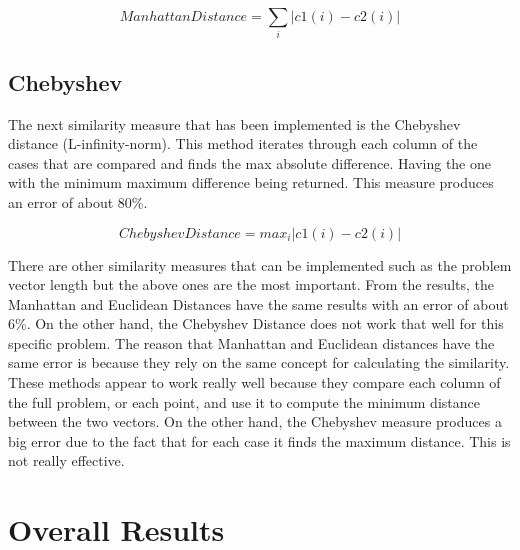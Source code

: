 \documentclass[a4paper,11pt]{article}
\begin{document}
\begin{equation}
Manhattan Distance = \sum_i |c1(i) - c2(i)|
\end{equation}

\subsection{Chebyshev}
The next similarity measure that has been implemented is the Chebyshev distance
(L-infinity-norm). This method iterates through each column of the cases that
are compared and finds the max absolute difference. Having the one with the
minimum maximum difference being returned. This measure produces an error of
about 80\%.

\begin{equation}
Chebyshev Distance = max_i |c1(i) - c2(i)|
\end{equation}

There are other similarity measures that can be implemented such as the problem
vector length but the above ones are the most important. From the results, the
Manhattan and Euclidean Distances have the same results with an error of about
6\%. On the other hand, the Chebyshev Distance does not work that well for this
specific problem. The reason that Manhattan and Euclidean distances have the
same error is because they rely on the same concept for calculating the
similarity. These methods appear to work really well because they compare each
column of the full problem, or each point, and use it to compute the minimum
distance between the two vectors. On the other hand, the Chebyshev measure
produces a big error due to the fact that for each case it finds the maximum
distance. This is not really effective.

\section{Overall Results}
\end{document}
